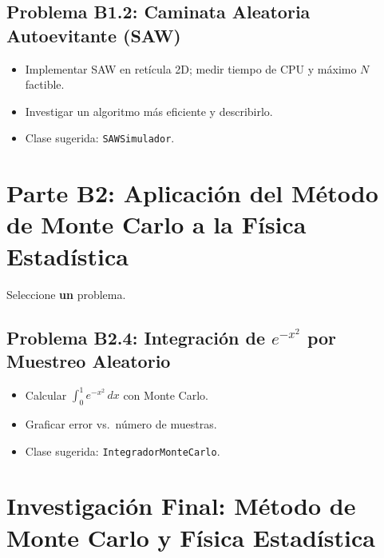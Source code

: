 \documentclass[11pt]{article}
\begin{document}
\subsection{Problema B1.2: Caminata Aleatoria Autoevitante (SAW)}

\begin{itemize}
  \item Implementar SAW en retícula 2D; medir tiempo de CPU y máximo $N$ factible.
  \item Investigar un algoritmo más eficiente y describirlo.
  \item Clase sugerida: \texttt{SAWSimulador}.
\end{itemize}


\section{Parte B2: Aplicación del Método de Monte Carlo a la Física Estadística}

Seleccione \textbf{un} problema.


\subsection{Problema B2.4: Integración de $e^{-x^2}$ por Muestreo Aleatorio}

\begin{itemize}
  \item Calcular $\displaystyle\int_0^1 e^{-x^2}\,dx$ con Monte Carlo.
  \item Graficar error vs.\ número de muestras.
  \item Clase sugerida: \texttt{IntegradorMonteCarlo}.
\end{itemize}

\section*{Investigación Final: Método de Monte Carlo y Física Estadística}
\end{document}

